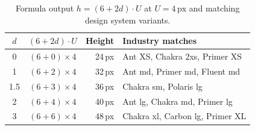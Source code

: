\begin{table}[ht]
\centering
\caption{Formula output $h = (6 + 2d) \cdot U$ at $U = 4\,\text{px}$ and matching design system variants.}
\label{tab:industry-validation}
\begin{tabular}{ccrl}
\toprule
$d$ & $(6 + 2d) \cdot U$ & Height & Industry matches \\
\midrule
0   & $(6 + 0) \times 4$   & 24\,px & Ant XS, Chakra 2xs, Primer XS \\
1   & $(6 + 2) \times 4$   & 32\,px & Ant md, Primer md, Fluent md \\
1.5 & $(6 + 3) \times 4$   & 36\,px & Chakra sm, Polaris lg \\
2   & $(6 + 4) \times 4$   & 40\,px & Ant lg, Chakra md, Primer lg \\
3   & $(6 + 6) \times 4$   & 48\,px & Chakra xl, Carbon lg, Primer XL \\
\bottomrule
\end{tabular}
\end{table}
